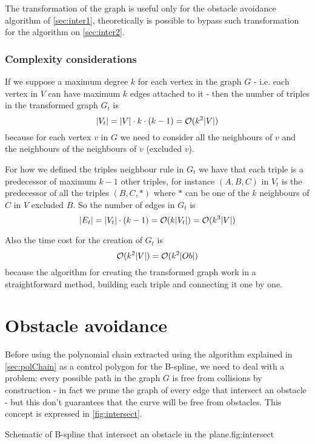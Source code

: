 \documentclass[dissertation.tex]{subfiles}
\begin{document}
The transformation of the graph is useful only for the obstacle
avoidance algorithm of
\cref{sec:inter1}, theoretically is possible to bypass such
transformation for the algorithm on \cref{sec:inter2}.

\subsubsection{Complexity considerations}
If we suppose a maximum degree $k$ for each vertex in the graph $G$ -
i.e. each vertex in $V$ can have maximum $k$ edges attached to
it - then the number of triples in the transformed graph $G_t$ is 
\begin{equation}
  \label{eq:numTriples}
  |V_t|=|V|\cdot k\cdot(k-1)=\mathcal{O}(k^2|V|)
\end{equation}
because for each vertex $v$ in $G$ we need to
consider all the neighbours of $v$ and the neighbours of the neighbours
of $v$ (excluded $v$).

For how we defined the triples neighbour rule in $G_t$ we have
that each triple is a predecessor of maximum $k-1$ other triples, for
instance $(A,B,C)$ in $V_t$ is the predecessor of all the triples
$(B,C,*)$ where $*$ can be one of the $k$ neighbours
of $C$ in $V$ excluded $B$. So the number of edges in $G_t$ is
\begin{equation}
  \label{eq:numEdgesTriples}
  |E_t|=|V_t|\cdot (k-1)=\mathcal{O}(k|V_t|)=\mathcal{O}(k^3|V|)
\end{equation}

Also the time cost for the creation of $G_t$ is
\begin{equation}
  \label{eq:costVt}
  \mathcal{O}(k^2|V|)=\mathcal{O}(k^2|Ob|)
\end{equation}
because the algorithm for creating the transformed graph work in a
straightforward method, building each triple and connecting it one by
one.

\section{Obstacle avoidance}\label{sec:obsAvoid}
Before using the polynomial chain extracted using the algorithm
explained in \cref{sec:polChain} as a control polygon for the
B-spline, we need to deal with a
problem: every possible path in the graph $G$ is
free from collisions by construction - in fact we prune the graph of
every edge that intersect an obstacle - but this don't guarantees that
the curve will be free from obstacles. This concept is expressed in \cref{fig:intersect}.
\begin{myfig}{Schematic of B-spline that intersect an obstacle in the plane.}{fig:intersect}
\end{myfig}
\end{document}
